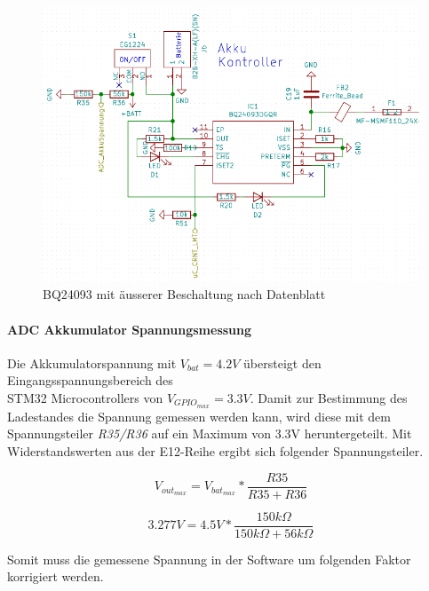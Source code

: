 \begin{figure} [H]
\begin{center}
\includegraphics[scale=0.5]{../graphics/Schema_Akku.png}
\caption{BQ24093 mit äusserer Beschaltung nach Datenblatt}
\label{fig:Schema_Akku}
\end{center}
\end{figure}

\paragraph{ADC Akkumulator Spannungsmessung}

Die Akkumulatorspannung mit ${V_{bat}=4.2\si{V}}$ übersteigt den Eingangsspannungsbereich des\\
 STM32 Microcontrollers von ${V_{GPIO_{max}}=3.3\si{V}}$.
Damit zur Bestimmung des Ladestandes die Spannung gemessen werden kann, wird diese mit dem Spannungsteiler \textit{R35/R36} auf ein Maximum von 3.3\si{V} heruntergeteilt. 
Mit Widerstandswerten aus der E12-Reihe ergibt sich folgender Spannungsteiler.

\begin{equation}
V_{out_{max}} = V_{bat_{max}}*\frac{R35}{R35+R36}
\end{equation}

\begin{equation}
3.277\si{V} = 4.5\si{V}*\frac{150\si{k\Omega}}{150\si{k\Omega}+56\si{k\Omega}}
\end{equation}

Somit muss die gemessene Spannung in der Software um folgenden Faktor korrigiert werden.


